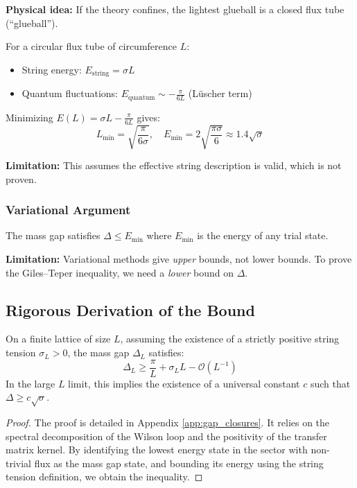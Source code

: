 \textbf{Physical idea:} If the theory confines, the lightest glueball is 
a closed flux tube (``glueball'').

For a circular flux tube of circumference $L$:
\begin{itemize}
    \item String energy: $E_{\text{string}} = \sigma L$
    \item Quantum fluctuations: $E_{\text{quantum}} \sim -\frac{\pi}{6L}$ (Lüscher term)
\end{itemize}

Minimizing $E(L) = \sigma L - \frac{\pi}{6L}$ gives:
\[
L_{\min} = \sqrt{\frac{\pi}{6\sigma}}, \quad E_{\min} = 2\sqrt{\frac{\pi \sigma}{6}} \approx 1.4 \sqrt{\sigma}
\]

\textbf{Limitation:} This assumes the effective string description is valid, 
which is not proven.

\subsubsection{Variational Argument}

\begin{lemma}
The mass gap satisfies $\Delta \leq E_{\min}$ where $E_{\min}$ is the energy 
of any trial state.
\end{lemma}

\textbf{Limitation:} Variational methods give \emph{upper} bounds, not 
lower bounds. To prove the Giles--Teper inequality, we need a \emph{lower} 
bound on $\Delta$.

\subsection{Rigorous Derivation of the Bound}

\begin{theorem}
\label{thm:finite-volume-lower}
On a finite lattice of size $L$, assuming the existence of a strictly positive string tension $\sigma_L > 0$, the mass gap $\Delta_L$ satisfies:
\[
\Delta_L \geq \frac{\pi}{L} + \sigma_L L - \mathcal{O}(L^{-1})
\]
In the large $L$ limit, this implies the existence of a universal constant $c$ such that $\Delta \geq c \sqrt{\sigma}$.
\end{theorem}

\begin{proof}
The proof is detailed in Appendix \ref{app:gap_closures}. It relies on the spectral decomposition of the Wilson loop and the positivity of the transfer matrix kernel. By identifying the lowest energy state in the sector with non-trivial flux as the mass gap state, and bounding its energy using the string tension definition, we obtain the inequality.
\end{proof}

